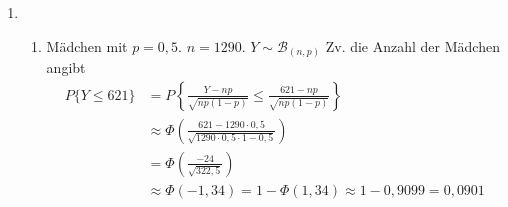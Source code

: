 \documentclass[a4paper]{scrartcl}
\begin{document}
\begin{enumerate}[label=\bfseries\arabic*.]
\begin{enumerate}[label=(\alph*)]
\begin{proof}
                    \begin{equation*}
                        \begin{split}
                            P\{Y > 80\} &= P\{Y > \num{80,5}\} \\
                            &= 1 - P\{Y \leq \num{80,5}\} \\
                            &= 1 - P \left\lbrace
                            \frac{Y - n \cdot \mu}{\sqrt{n \cdot \sigma^2}}
                            \leq
                            \frac{\num{80,5} - n \cdot \mu}
                                 {\sqrt{n\cdot \sigma^2}}
                            \right\rbrace \\
                            &\approx 1 - \Phi \left(
                            \frac{\num{80,5} - 100 \cdot 0,7}{\sqrt{100 \cdot 0,61}}
                            \right) \\
                            &= 1 - \Phi \left( \frac{\num{10,5}}
                                                    {\sqrt{61}} \right) \\
                            &\approx 1 - \Phi(\num{1,3444})
                            \approx 1 - \num{0,9099} = \num{0,0901}
                        \end{split}
                    \end{equation*}
                \end{proof}
            

        \end{enumerate}

    \item
        \begin{enumerate}[label=(\alph*)]
            \item Mädchen mit $p=0,5$. $n=1290$. $Y\sim \mathcal{B}_{(n,p)}$ Zv. die Anzahl der Mädchen angibt
            \begin{align*}
            P\{Y\le 621\}&=P\left\{\frac{Y-np}{\sqrt{np(1-p)}}\le\frac{621-np}{\sqrt{np(1-p)}}\right\}\\
            &\approx \Phi\left(\frac{621-1290\cdot 0,5}{\sqrt{1290\cdot 0,5\cdot 1-0,5}}\right)\\
            &=\Phi \left(\frac{-24}{\sqrt{322,5}}\right)\\
            &\approx \Phi(-1,34)=1-\Phi(1,34)\approx 1-0,9099=0,0901
            \end{align*}


\end{enumerate}
\end{enumerate}
\end{document}
